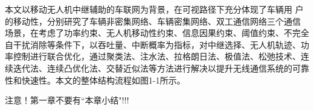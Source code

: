 本文以移动无人机中继辅助的车联网为背景，在可视路径下充分体现了车辆用
户的移动性，分别研究了车辆非密集网络、车辆密集网络、双工通信网络三个通信
场景，在考虑了功率约束、无人机移动性约束、信息因果约束、阈值约束、不完全
自干扰消除等条件下，以吞吐量、中断概率为指标，对中继选择、无人机轨迹、功
率控制进行联合优化，通过聚类法、注水法、拉格朗日法、极值法、松弛技术、连
续迭代法、连续凸优化法、交替近似法等方法进行解决以提升无线通信系统的可靠
性和快速性。本文的整体结构流程如图1-1所示。
\begin{comment}
\begin{verbatim}
以下是解决pdf文件复制乱码问题（方便论文查重，我已经按照第一种办法做了，如果有个别同学还是不成功，请按照后边方法，照做一下）！！！下面是另外两种办法，共三种办法！！！
(1) 在YSUthesis.cls的Line142，加上``\setCJKmainfont{新宋体}第一种办法！''
%%上面一行是解决pdf文件复制乱码问题！！！下面是另外两种办法，共三种办法！

(2) 在template.tex文件的前边，加上
``\usepackage{ccmap}删掉前边的注释！为了解决论文查重，PDF文件复制出现乱码问题，请去掉这行前面的注释，编译完成后，使用Adobe Acrobat 删掉论文前面多余的两页即可！！！不知道是什么原因，但是这样可以解决问题，有待大家找到更好的解决办法！！！这种方法在编译过程中会终止，需要回车一下！！！''

(3) 在template.tex文件的\classification{O226}前边，加上
``为了解决论文查重，PDF文件复制出现乱码问题，请去掉这行前面的注释，编译完成后，使用Adobe Acrobat 删掉论文前面多余的两页即可！！！不知道是什么原因，但是这样可以解决问题，有待大家找到更好的解决办法！！！''
\end{verbatim}
\end{comment}


注意！第一章不要有``本章小结"!!!
